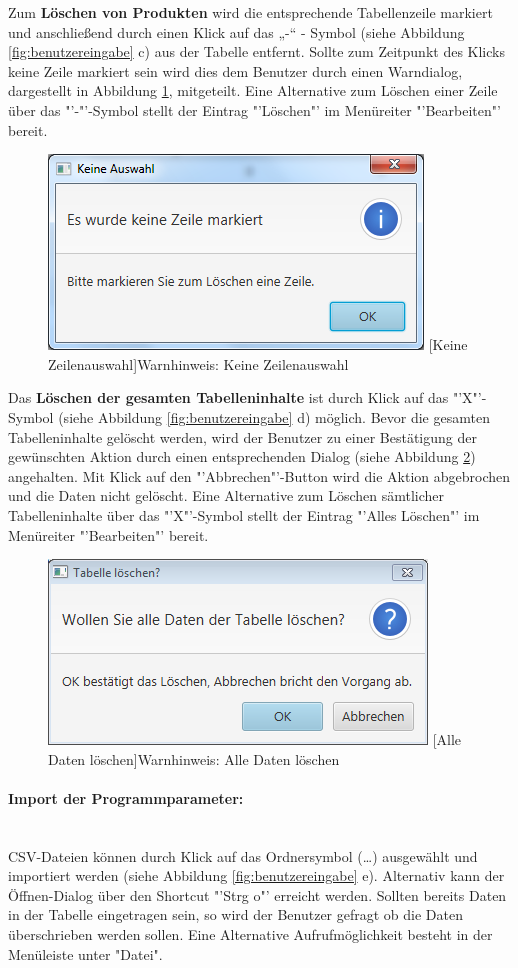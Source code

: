 Zum \textbf{Löschen von Produkten} wird die entsprechende Tabellenzeile markiert und anschließend durch einen Klick auf das „-“ - Symbol (siehe Abbildung \ref{fig:benutzereingabe} c) aus der Tabelle entfernt. Sollte zum Zeitpunkt des Klicks keine Zeile markiert sein wird dies dem Benutzer durch einen Warndialog, dargestellt in Abbildung \ref{fig:keineauswahl}, mitgeteilt. Eine Alternative zum Löschen einer Zeile über das "'-"'-Symbol stellt der Eintrag "'Löschen"' im Menüreiter "'Bearbeiten"' bereit.
\begin{figure}[H]
	\centering
	\includegraphics[width=0.5\linewidth]{Bilder/KeineZeilenAuswahl.png} 
	[Keine Zeilenauswahl]{Warnhinweis: Keine Zeilenauswahl}
	\label{fig:keineauswahl}
\end{figure}
Das \textbf{Löschen der gesamten Tabelleninhalte} ist durch Klick auf das "'X"'-Symbol (siehe Abbildung \ref{fig:benutzereingabe} d) möglich. Bevor die gesamten Tabelleninhalte gelöscht werden, wird der Benutzer zu einer Bestätigung der gewünschten Aktion durch einen entsprechenden Dialog (siehe Abbildung \ref{fig:datenloeschen}) angehalten. Mit Klick auf den "'Abbrechen"'-Button wird die Aktion abgebrochen und die Daten nicht gelöscht. Eine Alternative zum Löschen sämtlicher Tabelleninhalte über das "'X"'-Symbol stellt der Eintrag "'Alles Löschen"' im Menüreiter "'Bearbeiten"' bereit.
\begin{figure}[H]
	\centering
	\includegraphics[width=0.5\linewidth]{Bilder/DatenLoeschen.png} 
	[Alle Daten löschen]{Warnhinweis: Alle Daten löschen}
	\label{fig:datenloeschen}
\end{figure}

\paragraph{Import der Programmparameter:}~\\
CSV-Dateien können durch Klick auf das Ordnersymbol (…) ausgewählt und importiert werden (siehe Abbildung \ref{fig:benutzereingabe} e). Alternativ kann der Öffnen-Dialog über den Shortcut "'Strg o"' erreicht werden. Sollten bereits Daten in der Tabelle eingetragen sein, so wird der Benutzer gefragt ob die Daten überschrieben werden sollen. Eine Alternative Aufrufmöglichkeit besteht in der Menüleiste unter "Datei".

